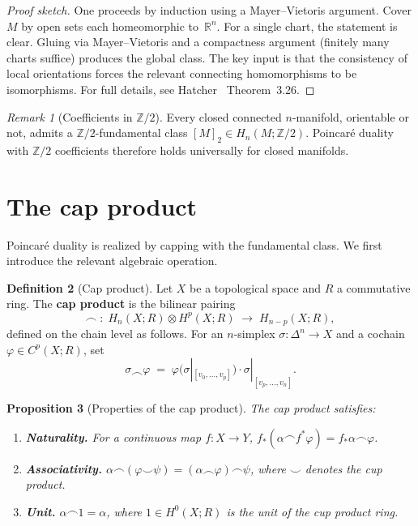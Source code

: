 \documentclass[12pt,a4paper,openany]{book}
\theoremstyle{definition}
\newtheorem{definition}{Definition}[chapter]
\theoremstyle{plain}
\newtheorem{proposition}[definition]{Proposition}
\theoremstyle{remark}
\newtheorem{remark}[definition]{Remark}
\newcommand{\Z}{\mathbb{Z}}
\newcommand{\R}{\mathbb{R}}
\begin{document}
\begin{proof}[Proof sketch]
One proceeds by induction using a Mayer--Vietoris
argument.  Cover $M$ by open sets each homeomorphic to~$\R^n$.  For a
single chart, the statement is clear.  Gluing via Mayer--Vietoris and
a compactness argument (finitely many charts suffice) produces the
global class.  The key input is that the consistency of local
orientations forces the relevant connecting homomorphisms to be
isomorphisms.  For full details, see Hatcher~\cite{hatcher}
Theorem~3.26.
\end{proof}

\begin{remark}[Coefficients in $\Z/2$]
\index{Z/2 coefficients@$\Z/2$ coefficients}
Every closed connected $n$-manifold, orientable or not, admits a
$\Z/2$-fundamental class $[M]_2\in H_n(M;\Z/2)$.  Poincar\'e duality
with $\Z/2$ coefficients therefore holds universally for closed
manifolds.
\end{remark}

\section{The cap product}\label{sec:cap-product}

Poincar\'e duality is realized by capping with the fundamental class.
We first introduce the relevant algebraic operation.

\begin{definition}[Cap product]
Let $X$ be a topological space and $R$ a commutative ring.  The
\textbf{cap product} is the bilinear pairing
\[
  \frown\;:\; H_n(X;R)\otimes H^p(X;R) \;\longrightarrow\;
  H_{n-p}(X;R),
\]
defined on the chain level as follows.  For an $n$-simplex
$\sigma\colon\Delta^n\to X$ and a cochain
$\varphi\in C^p(X;R)$, set
\[
  \sigma \frown \varphi
  \;=\;
  \varphi\bigl(\sigma|_{[v_0,\dots,v_p]}\bigr)
  \cdot
  \sigma|_{[v_p,\dots,v_n]}.
\]
\end{definition}

\begin{proposition}[Properties of the cap product]
\label{prop:cap-properties}
The cap product satisfies:
\begin{enumerate}[label=(\roman*)]
  \item \textbf{Naturality.}  For a continuous map $f\colon X\to Y$,
    $f_*(\alpha\frown f^*\varphi) = f_*\alpha\frown\varphi$.
  \item \textbf{Associativity.}  $\alpha\frown(\varphi\smile\psi)
    = (\alpha\frown\varphi)\frown\psi$, where $\smile$ denotes the
    cup product.
  \item \textbf{Unit.}  $\alpha\frown 1 = \alpha$, where
    $1\in H^0(X;R)$ is the unit of the cup product ring.
\end{enumerate}
\end{proposition}
\end{document}
